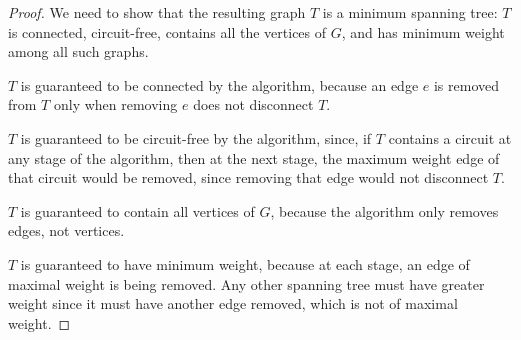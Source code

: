 \documentclass[14pt]{extarticle}
\begin{document}
\begin{proof}
    We need to show that the resulting graph \(T\) is a minimum spanning tree: \(T\) is connected, circuit-free, contains all
    the vertices of \(G\), and has minimum weight among all such graphs.

    \(T\) is guaranteed to be connected by the algorithm, because an edge \(e\) is removed from \(T\) only when removing \(e\)
    does not disconnect \(T\).

    \(T\) is guaranteed to be circuit-free by the algorithm, since, if \(T\) contains a circuit at any stage of the
    algorithm, then at the next stage, the maximum weight edge of that circuit would be removed, since removing that edge would
    not disconnect \(T\).

    \(T\) is guaranteed to contain all vertices of \(G\), because the algorithm only removes edges, not vertices.

    \(T\) is guaranteed to have minimum weight, because at each stage, an edge of maximal weight is being removed. Any other
    spanning tree must have greater weight since it must have another edge removed, which is not of maximal weight.
\end{proof}
\end{document}
